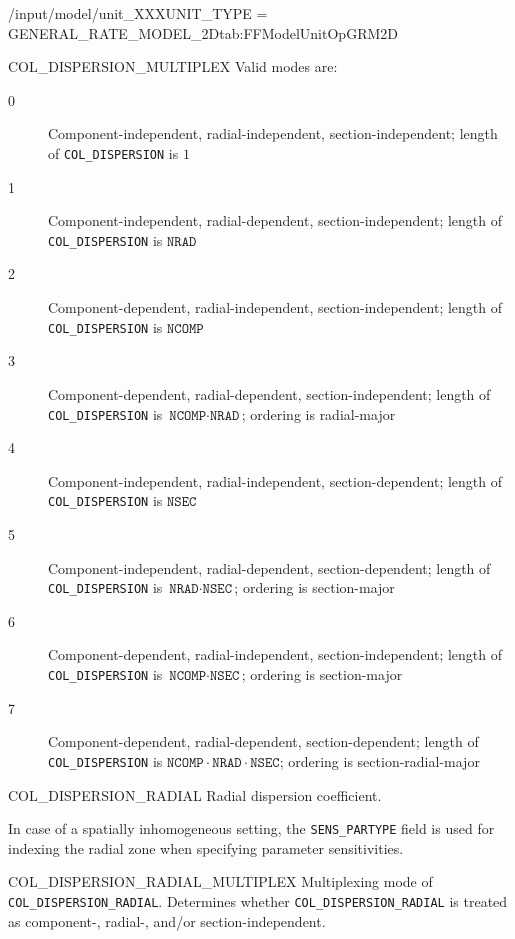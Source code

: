 \begin{condsubgroup}{/input/model/unit\_XXX}{UNIT\_TYPE = GENERAL\_RATE\_MODEL\_2D}{tab:FFModelUnitOpGRM2D}
\begin{dataset}[unit=--,type=int,range={$\{0, \dots, 7 \}$},length={1}]{COL\_DISPERSION\_MULTIPLEX}
    Valid modes are:
    \begin{description}
      \item[0] Component-independent, radial-independent, section-independent; length of \texttt{COL\_DISPERSION} is $1$
      \item[1] Component-independent, radial-dependent, section-independent; length of \texttt{COL\_DISPERSION} is $\texttt{NRAD}$
      \item[2] Component-dependent, radial-independent, section-independent; length of \texttt{COL\_DISPERSION} is $\texttt{NCOMP}$
      \item[3] Component-dependent, radial-dependent, section-independent; length of \texttt{COL\_DISPERSION} is $\texttt{NCOMP} \cdot \texttt{NRAD}$; ordering is radial-major
      \item[4] Component-independent, radial-independent, section-dependent; length of \texttt{COL\_DISPERSION} is $\texttt{NSEC}$
      \item[5] Component-independent, radial-dependent, section-dependent; length of \texttt{COL\_DISPERSION} is $\texttt{NRAD} \cdot \texttt{NSEC}$; ordering is section-major
      \item[6] Component-dependent, radial-independent, section-independent; length of \texttt{COL\_DISPERSION} is $\texttt{NCOMP} \cdot \texttt{NSEC}$; ordering is section-major
      \item[7] Component-dependent, radial-dependent, section-dependent; length of \texttt{COL\_DISPERSION} is $\texttt{NCOMP} \cdot \texttt{NRAD} \cdot \texttt{NSEC}$; ordering is section-radial-major
    \end{description}\vspace{-\baselineskip}
  \end{dataset}
  \begin{dataset}[unit=\si{\square\metre\of{IV}\per\second},type=double,range={$\geq 0$},length={see \texttt{COL\_DISPERSION\_RADIAL\_MULTIPLEX}}]{COL\_DISPERSION\_RADIAL}
    Radial dispersion coefficient.

    In case of a spatially inhomogeneous setting, the \texttt{SENS\_PARTYPE} field is used for indexing the radial zone when specifying parameter sensitivities.
  \end{dataset}
  \begin{dataset}[unit=--,type=int,range={$\{0, \dots, 7 \}$},length={1}]{COL\_DISPERSION\_RADIAL\_MULTIPLEX}
    Multiplexing mode of \texttt{COL\_DISPERSION\_RADIAL}.
    Determines whether \texttt{COL\_DISPERSION\_RADIAL} is treated as component-, radial-, and/or section-independent.


\end{dataset}
\end{condsubgroup}
